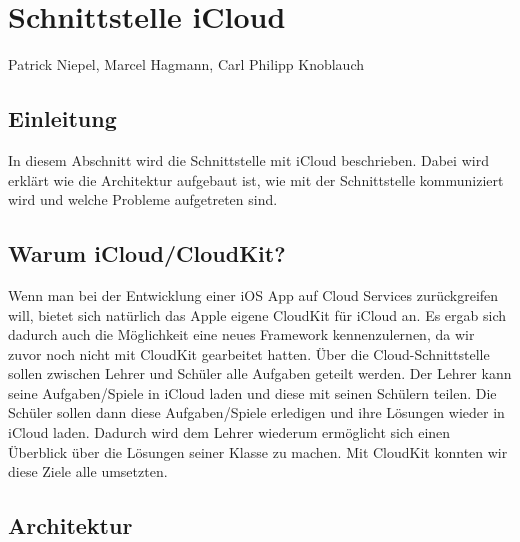 \chapter{Schnittstelle iCloud}
Patrick Niepel, Marcel Hagmann, Carl Philipp Knoblauch

\section{Einleitung}
In diesem Abschnitt wird die Schnittstelle mit iCloud beschrieben. Dabei wird erklärt wie die Architektur aufgebaut ist, wie mit der Schnittstelle kommuniziert wird und welche Probleme aufgetreten sind. 

\section{Warum iCloud/CloudKit?}

Wenn man bei der Entwicklung einer iOS App auf Cloud Services zurückgreifen will, bietet sich natürlich das Apple eigene CloudKit für iCloud an. Es ergab sich dadurch auch die Möglichkeit eine neues Framework kennenzulernen, da wir zuvor noch nicht mit CloudKit gearbeitet hatten. 
Über die Cloud-Schnittstelle sollen zwischen Lehrer und Schüler alle Aufgaben geteilt werden. Der Lehrer kann seine Aufgaben/Spiele in iCloud laden und diese mit seinen Schülern teilen. Die Schüler sollen dann diese Aufgaben/Spiele erledigen und ihre Lösungen wieder in iCloud laden. Dadurch wird dem Lehrer wiederum ermöglicht sich einen Überblick über die Lösungen seiner Klasse zu machen. Mit CloudKit konnten wir diese Ziele alle umsetzten.

\section{Architektur}


